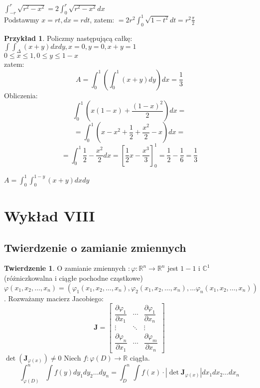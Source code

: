 \documentclass{article}
\theoremstyle{definition}
\theoremstyle{definition}
\newtheorem{tw}{Twierdzenie}[subsection]
\theoremstyle{definition}
\newtheorem{pk}{Przykład}[subsection]
\theoremstyle{definition}
\begin{document}
$\int_{-r}^{r} \sqrt{r^2-x^2} = 2\int_{0}^{r} \sqrt{r^2-x^2} dx$\\
Podstawmy $x=rt, dx = r dt$, zatem:
$=2r^2 \int_0^1 \sqrt{1-t^2} dt = r^2 \frac{\pi}{2}$

\begin{pk}
Policzmy następującą całkę:\\
$\int \int_{\Delta} (x+y) dx dy, x=0,y=0, x+y=1$\\
$0 \leq x \leq 1, 0 \leq y \leq 1-x$\\
zatem:
\[A=\int_0^1 \left( \int_0^1 (x+y) dy\right) dx = \frac{1}{3}\]
Obliczenia:
\[\int_0^1 \left(x(1-x) + \frac{(1-x)^2}{2}\right) dx=\]
\[=\int_0^1 (x-x^2+\frac{1}{2} + \frac{x^2}{2} - x) dx=\]
\[=\int_0^1 \frac{1}{2} - \frac{x^2}{2} dx = \left[\frac{1}{2} x - \frac{x^3}{3}\right]_0^1 = \frac{1}{2} - \frac{1}{6} = \frac{1}{3}\]
\end{pk}

$A=\int_0^1 \int_0^{1-y} (x+y) dx dy$

\section{Wykład VIII}

\subsection{Twierdzenie o zamianie zmiennych}

\begin{tw}
    O zamianie zmiennych $:\varphi: \mathbb{R}^n \rightarrow \mathbb{R}^n$ jest $1-1$ i $\mathbb{C}^{1}$ (różniczkowalna i ciągłe pochodne cząstkowe)
    $\varphi(x_1,x_2,\dots,x_n)=\left(\varphi_1(x_1,x_2,\dots,x_n), \varphi_2(x_1,x_2,\dots,x_n), \dots \varphi_n(x_1,x_2,\dots,x_n)\right)$.
    Rozważamy macierz Jacobiego:
    \[\mathbf {J} ={\begin{bmatrix}{\dfrac {\partial \varphi_{1}}{\partial x_{1}}}&\cdots &{\dfrac {\partial \varphi_{1}}{\partial x_{n}}}\\\vdots &\ddots &\vdots \\{\dfrac {\partial \varphi_{n}}{\partial x_{1}}}&\cdots &{\dfrac {\partial \varphi_{m}}{\partial x_{n}}}\end{bmatrix}}\]
    $\det\left(\mathbf {J}_{\varphi(x)}\right) \neq 0$
    Niech $f:\varphi(D)\rightarrow\mathbb{R}$ ciągła.
    \[\int_{\varphi(D)}^{n}\int f(y) dy_1 dy_2 \dots dy_n = \int_{D}^{n} \int f(x) \cdot \left|\det\mathbf{J}_{\varphi(x)}\right| dx_1 dx_2 \dots dx_n\]
\end{tw}
\end{document}
